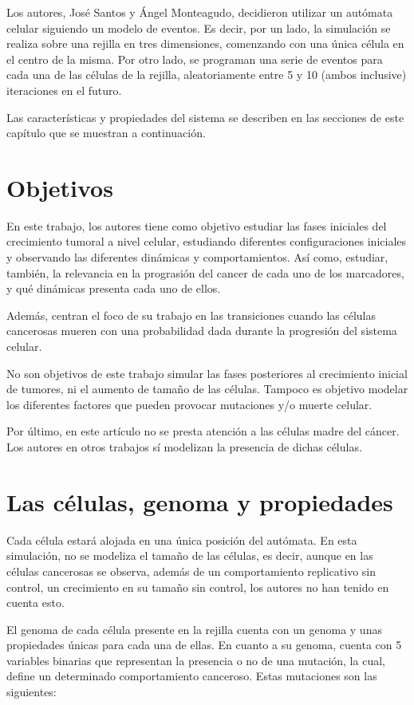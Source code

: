 Los autores, José Santos y Ángel Monteagudo, decidieron utilizar un autómata celular
siguiendo un modelo de eventos. Es decir, por un lado, la simulación se realiza
sobre una rejilla en tres dimensiones, comenzando con una única célula en el centro de la misma.
Por otro lado, se programan una serie de eventos para cada una de las células de la rejilla, aleatoriamente
entre 5 y 10 (ambos inclusive) iteraciones en el futuro.

Las características y propiedades del sistema se describen en las secciones de este capítulo que
se muestran a continuación.

\section{Objetivos}

En este trabajo, los autores tiene como objetivo estudiar las fases iniciales del crecimiento tumoral a nivel celular,
estudiando diferentes configuraciones iniciales y observando las diferentes dinámicas y comportamientos. Así como,
estudiar, también, la relevancia en la prograsión del cancer de cada uno de los marcadores, y qué
dinámicas presenta cada uno de ellos.

Además, centran el foco de su trabajo en las transiciones cuando las células cancerosas
mueren con una probabilidad dada durante la progresión del sistema celular.

No son objetivos de este trabajo simular las fases posteriores al crecimiento inicial de tumores, ni el
aumento de tamaño de las células. Tampoco es objetivo modelar los diferentes factores que
pueden provocar mutaciones y/o muerte celular.

Por último, en este artículo no se presta atención a las células madre del cáncer. Los autores en
otros trabajos \cite{jsantos-amonteagudo-2015} sí modelizan la presencia de dichas células.

\section{Las células, genoma y propiedades}

Cada célula estará alojada en una única posición del autómata. En esta simulación, no se modeliza
el tamaño de las células, es decir, aunque en las células cancerosas se observa, además de un comportamiento
replicativo sin control, un crecimiento en su tamaño sin control, los autores no han tenido en cuenta esto.

El genoma de cada célula presente en la rejilla cuenta con un genoma y unas propiedades únicas para cada una de ellas.
En cuanto a su genoma, cuenta con 5 variables binarias que representan la presencia o no de una mutación, la cual, define
un determinado comportamiento canceroso. Estas mutaciones son las siguientes:

